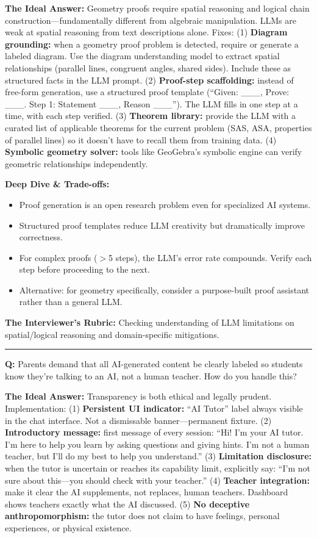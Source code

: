 \textbf{The Ideal Answer:} Geometry proofs require spatial reasoning and logical chain construction---fundamentally different from algebraic manipulation. LLMs are weak at spatial reasoning from text descriptions alone. Fixes: (1) \textbf{Diagram grounding:} when a geometry proof problem is detected, require or generate a labeled diagram. Use the diagram understanding model to extract spatial relationships (parallel lines, congruent angles, shared sides). Include these as structured facts in the LLM prompt. (2) \textbf{Proof-step scaffolding:} instead of free-form generation, use a structured proof template (``Given: \_\_\_, Prove: \_\_\_. Step 1: Statement \_\_\_, Reason \_\_\_''). The LLM fills in one step at a time, with each step verified. (3) \textbf{Theorem library:} provide the LLM with a curated list of applicable theorems for the current problem (SAS, ASA, properties of parallel lines) so it doesn't have to recall them from training data. (4) \textbf{Symbolic geometry solver:} tools like GeoGebra's symbolic engine can verify geometric relationships independently.

\textbf{Deep Dive \& Trade-offs:}
\begin{itemize}
  \item Proof generation is an open research problem even for specialized AI systems.
  \item Structured proof templates reduce LLM creativity but dramatically improve correctness.
  \item For complex proofs ($>$5 steps), the LLM's error rate compounds. Verify each step before proceeding to the next.
  \item Alternative: for geometry specifically, consider a purpose-built proof assistant rather than a general LLM.
\end{itemize}

\textbf{The Interviewer's Rubric:} Checking understanding of LLM limitations on spatial/logical reasoning and domain-specific mitigations.

\bigskip\hrule\bigskip

\textbf{Q:} Parents demand that all AI-generated content be clearly labeled so students know they're talking to an AI, not a human teacher. How do you handle this?

\textbf{The Ideal Answer:} Transparency is both ethical and legally prudent. Implementation: (1) \textbf{Persistent UI indicator:} ``AI Tutor'' label always visible in the chat interface. Not a dismissable banner---permanent fixture. (2) \textbf{Introductory message:} first message of every session: ``Hi! I'm your AI tutor. I'm here to help you learn by asking questions and giving hints. I'm not a human teacher, but I'll do my best to help you understand.'' (3) \textbf{Limitation disclosure:} when the tutor is uncertain or reaches its capability limit, explicitly say: ``I'm not sure about this---you should check with your teacher.'' (4) \textbf{Teacher integration:} make it clear the AI supplements, not replaces, human teachers. Dashboard shows teachers exactly what the AI discussed. (5) \textbf{No deceptive anthropomorphism:} the tutor does not claim to have feelings, personal experiences, or physical existence.

